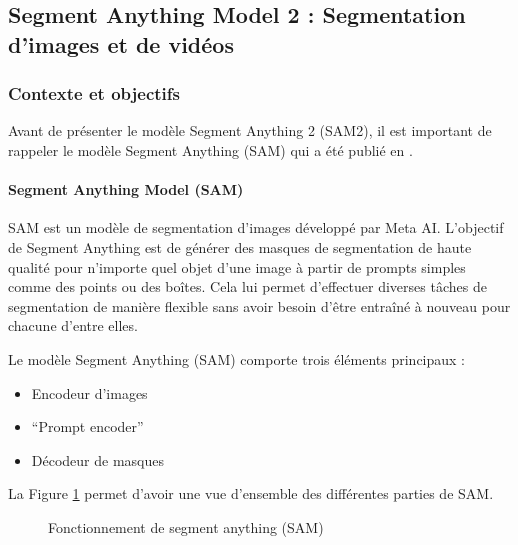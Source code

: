 
\subsection{Segment Anything Model 2 : Segmentation d'images et de vidéos}
\label{subsec:sam2_segment_anything_2024}

\subsubsection{Contexte et objectifs}
Avant de présenter le modèle Segment Anything 2 (SAM2), il est important de rappeler le modèle Segment Anything (SAM) qui a été publié en \citeyear{kirillov_segment_2023}.

\paragraph{Segment Anything Model (SAM)}
\label{par:sam_segment_anything_2023}
SAM \cite{kirillov_segment_2023} est un modèle de segmentation d'images développé par Meta AI. L'objectif de Segment Anything est de générer des masques de segmentation de haute qualité pour n'importe quel objet d'une image à partir de prompts simples comme des points ou des boîtes. Cela lui permet d'effectuer diverses tâches de segmentation de manière flexible sans avoir besoin d'être entraîné à nouveau pour chacune d'entre elles.

Le modèle Segment Anything (SAM) comporte trois éléments principaux :
\begin{itemize}
    \item Encodeur d'images
    \item ``Prompt encoder''
    \item Décodeur de masques
\end{itemize}
La Figure \ref{fig:ch2_sam2_01_fonctionnement_sam} permet d’avoir une vue d’ensemble des différentes parties de SAM.

\begin{figure}[H]
    \centering
    \caption{Fonctionnement de segment anything (SAM)}
    \label{fig:ch2_sam2_01_fonctionnement_sam}
\end{figure}

